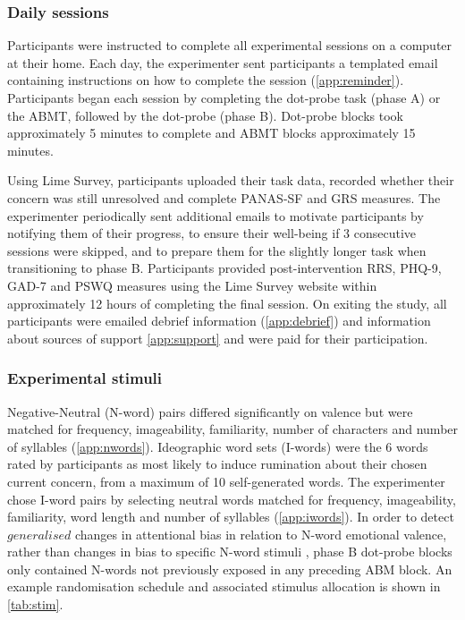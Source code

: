 \documentclass[man,floatsintext,a4paper,biblatex]{apa6}\usepackage[]{graphicx}\usepackage[]{color}
\begin{document}
\subsubsection{Daily sessions}

Participants were instructed to complete all experimental sessions on a
computer at their home. Each day, the experimenter sent participants a
templated email containing instructions on how to complete the session
(\cref{app:reminder}). Participants began each session by completing
the dot-probe task (phase A) or the ABMT, followed by the
dot-probe (phase B). Dot-probe blocks took approximately 5 minutes to
complete and ABMT blocks approximately 15 minutes.

Using Lime Survey, participants uploaded their task data, recorded
whether their concern was still unresolved and complete PANAS-SF and
GRS measures. The experimenter periodically sent additional emails to
motivate participants by notifying them of their progress, to ensure their
well-being if 3 consecutive sessions were skipped, and to prepare them
for the slightly longer task when transitioning to phase B. Participants
provided post-intervention RRS, PHQ-9, GAD-7 and PSWQ measures using
the Lime Survey website within approximately 12 hours of completing
the final session. On exiting the study, all participants were emailed
debrief information (\cref{app:debrief}) and information about sources of
support \cref{app:support} and were paid for their participation.

\subsubsection{Experimental stimuli}

Negative-Neutral (N-word) pairs differed significantly on valence but were
matched for frequency, imageability, familiarity, number of characters
and number of syllables (\cref{app:nwords}). Ideographic word sets
(I-words) were the 6 words rated by participants as most likely to
induce rumination about their chosen current concern, from a maximum
of 10 self-generated words. The experimenter chose I-word pairs by
selecting neutral words matched for frequency, imageability, familiarity,
word length and number of syllables (\cref{app:iwords}). In order
to detect ${generalised}$ changes in attentional bias in relation to
N-word emotional valence, rather than changes in bias to specific N-word
stimuli \parencite{see_reduction_2009}, phase B dot-probe blocks only
contained N-words not previously exposed in any preceding ABM block. An
example randomisation schedule and associated stimulus allocation is
shown in \cref{tab:stim}.
\end{document}
